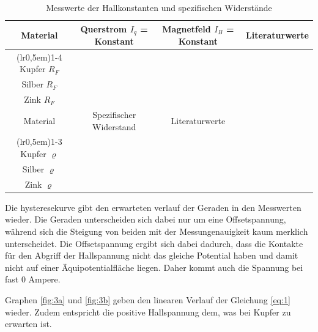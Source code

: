 \begin{table}[H]
\centering
    \begin{tabular}{c c c c}
    \toprule
        \multicolumn{1}{c}{Material} & \multicolumn{1}{c}{Querstrom $I_q$ = Konstant} & 
        \multicolumn{1}{c}{Magnetfeld $I_B$ = Konstant} & \multicolumn{1}{c}{Literaturwerte}\\
    \cmidrule(lr{0,5em}){1-4}
        Kupfer $R_F$ & \text{} & \text{} & \text{} \\
        Silber $R_F$ & \text{} & \text{} & \text{} \\
        Zink $R_F$   & \text{} & \text{} & \text{} \\
    \toprule
        \multicolumn{1}{c}{Material} & \multicolumn{1}{c}{Spezifischer Widerstand} & 
        \multicolumn{1}{c}{Literaturwerte} & \multicolumn{1}{c}{}\\
    \cmidrule(lr{0,5em}){1-3}
        Kupfer $\varrho$ & \text{} & \text{} & \\
        Silber $\varrho$ & \text{} & \text{} & \\
        Zink $\varrho$   & \text{} &                                & \\
    \bottomrule
    \end{tabular}
\caption{Messwerte der Hallkonstanten und spezifischen Widerstände}
\label{tab:11}
\end{table}

Die hysteresekurve gibt den erwarteten verlauf der Geraden in den Messwerten wieder.
Die Geraden unterscheiden sich dabei nur um eine Offsetspannung, während sich die Steigung
von beiden mit der Messungenauigkeit kaum merklich unterscheidet. Die Offsetspannung
ergibt sich dabei dadurch, dass die Kontakte für den Abgriff der Hallspannung nicht
das gleiche Potential haben und damit nicht auf einer Äquipotentialfläche liegen.
Daher kommt auch die Spannung bei fast 0 Ampere.


\justifying Graphen \ref{fig:3a} und \ref{fig:3b} geben den linearen Verlauf der Gleichung \eqref{eq:1}
wieder. Zudem entspricht die positive Hallspannung dem, was bei Kupfer zu erwarten ist.

